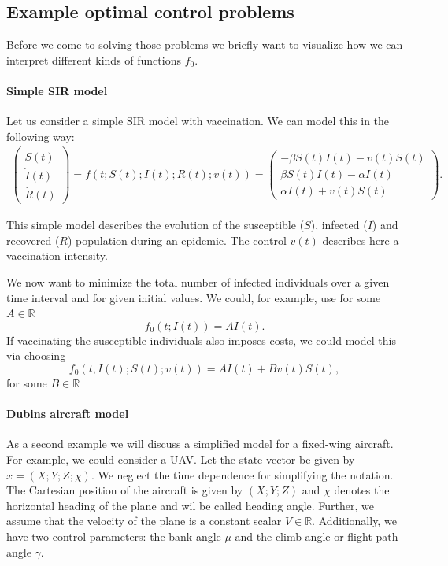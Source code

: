\documentclass[a4paper]{article}
\theoremstyle{definitions}
\theoremstyle{bemerkung}
\theoremstyle{satz}
\theoremstyle{satz}
\begin{document}
\subsection{Example optimal control problems}
Before we come to solving those problems we briefly want to visualize how we can interpret different kinds of functions $f_0$.
\paragraph{Simple SIR model}
Let us consider a simple SIR model with vaccination. We can model this in the following way:
\begin{align*}
    \begin{pmatrix}
        \dot{S}(t)\\
        \dot{I}(t)\\
        \dot{R}(t)
    \end{pmatrix}=f(t;S(t);I(t);R(t);v(t))=
    \begin{pmatrix}
        -\beta S(t)I(t)-v(t)S(t)\\
        \beta S(t)I(t)-\alpha I(t)\\
        \alpha I(t)+v(t)S(t)
    \end{pmatrix}.
\end{align*}

This simple model describes the evolution of the susceptible ($S$), infected ($I$) and recovered ($R$) population during an epidemic. The control $v(t)$ describes here a vaccination intensity.

We now want to minimize the total number of infected individuals over a given time interval and for given initial values. We could, for example, use for some $A \in \mathbb{R}$
$$f_0(t;I(t)) = AI(t).$$
If vaccinating the susceptible individuals also imposes costs, we could model this via choosing
 $$f_0(t, I(t);S(t);v(t))= AI(t)+Bv(t)S(t),$$
for some $B\in \mathbb{R}$
\paragraph{Dubins aircraft model} As a second example we will discuss a simplified model for a fixed-wing aircraft. For example, we could consider a UAV. Let the state vector be given by $x=(X;Y;Z;\chi)$. We neglect the time dependence for simplifying the notation. The Cartesian position of the aircraft is given by $(X;Y;Z)$ and $\chi$ denotes the horizontal heading of the plane and wil be called heading angle. Further, we assume that the velocity of the plane is a constant scalar $V\in \mathbb{R}$. Additionally, we have two control parameters:  the bank angle $\mu$ and the climb angle or flight path angle $\gamma$. 
\end{document}

